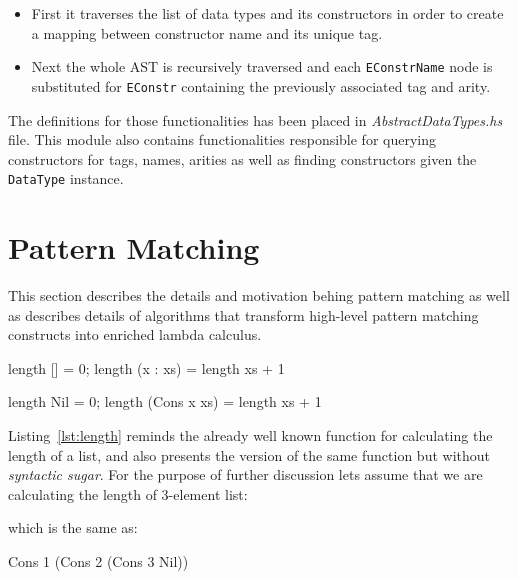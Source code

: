 \documentclass[12pt,a4paper]{report}
\begin{document}
\begin{itemize}
  \item First it traverses the list of data types and its constructors in order
    to create a mapping between constructor name and its unique tag.
  \item Next the whole AST is recursively traversed and each
    \texttt{EConstrName} node is substituted for \texttt{EConstr} containing
    the previously associated tag and arity.
\end{itemize}

The definitions for those functionalities has been placed in
\textit{AbstractDataTypes.hs} file. This module also contains functionalities
responsible for querying constructors for tags, names, arities as well as
finding constructors given the \texttt{DataType} instance.


\section{Pattern Matching}
This section describes the details and motivation behing pattern matching as
well as describes details of algorithms that transform high-level pattern
matching constructs into enriched lambda calculus.

\vspace*{0.2in}
\begin{code}[style=haskell,label=lst:length,caption={Calculating length of list.}]
length [] = 0;
length (x : xs) = length xs + 1

length Nil = 0;
length (Cons x xs) = length xs + 1
\end{code}

Listing~\ref{lst:length} reminds the already well known function for
calculating the length of a list, and also presents the version of the same
function but without \textit{syntactic sugar}. For the purpose of further
discussion lets assume that we are calculating the length of 3-element list:

\vspace*{0.2in}
\begin{code}[style=haskell]
[1, 2, 3]
\end{code}

which is the same as:

\vspace*{0.2in}
\begin{code}[style=haskell]
Cons 1 (Cons 2 (Cons 3 Nil))
\end{code}
\end{document}

